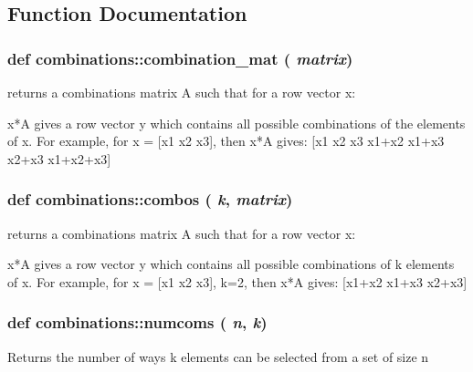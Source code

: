 \subsection{Function Documentation}
\hypertarget{namespacecombinations_a588fb56fb35f2df61790cf15ef69375c}{
\subsubsection[{combination\_\-mat}]{\setlength{\rightskip}{0pt plus 5cm}def combinations::combination\_\-mat ( {\em matrix})}}
\label{d7/d2b/namespacecombinations_a588fb56fb35f2df61790cf15ef69375c}
\begin{DoxyVerb}returns a combinations matrix A such that for a row vector x:

x*A gives a row vector y which contains all possible combinations of 
the elements of x. For example, for x = [x1 x2 x3], then x*A gives:
[x1 x2 x3 x1+x2 x1+x3 x2+x3 x1+x2+x3]\end{DoxyVerb}
 \hypertarget{namespacecombinations_ad6b224efacd64f54ea9aed50553a90e7}{
\subsubsection[{combos}]{\setlength{\rightskip}{0pt plus 5cm}def combinations::combos ( {\em k}, \/   {\em matrix})}}
\label{d7/d2b/namespacecombinations_ad6b224efacd64f54ea9aed50553a90e7}
\begin{DoxyVerb}returns a combinations matrix A such that for a row vector x:

x*A gives a row vector y which contains all possible combinations of 
k elements of x. For example, for x = [x1 x2 x3], k=2, then 
x*A gives: [x1+x2 x1+x3 x2+x3]\end{DoxyVerb}
 \hypertarget{namespacecombinations_a291e325d47c2536bd076643ed9e43a18}{
\subsubsection[{numcoms}]{\setlength{\rightskip}{0pt plus 5cm}def combinations::numcoms ( {\em n}, \/   {\em k})}}
\label{d7/d2b/namespacecombinations_a291e325d47c2536bd076643ed9e43a18}
\begin{DoxyVerb}Returns the number of ways k elements can be selected from a
set of size n\end{DoxyVerb}
